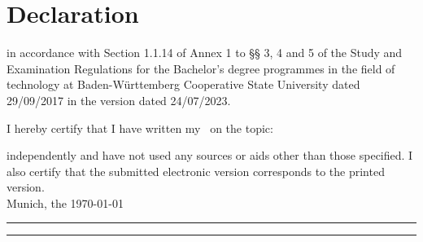 %
%
%
%

\chapter*{Declaration} %

in accordance with Section 1.1.14 of Annex 1 to §§ 3, 4 and 5 of the Study and Examination Regulations for the Bachelor's degree programmes in the field of technology at Baden-Württemberg Cooperative State University dated 29/09/2017 in the version dated 24/07/2023.

I hereby certify that I have written my  \arbeit\ on the topic: 

\begin{quote}
	\textit{\titel} %
\end{quote}

independently and have not used any sources or aids other than those specified. I also certify that the submitted electronic version corresponds to the printed version.\\[6ex]

Munich, the \today \\[1ex]

\rule[-0.2cm]{5cm}{0.5pt}  \rule[-0.2cm]{5cm}{0.5pt}  \\

\autor \\[10ex]

\rmfamily

\thispagestyle{empty}

